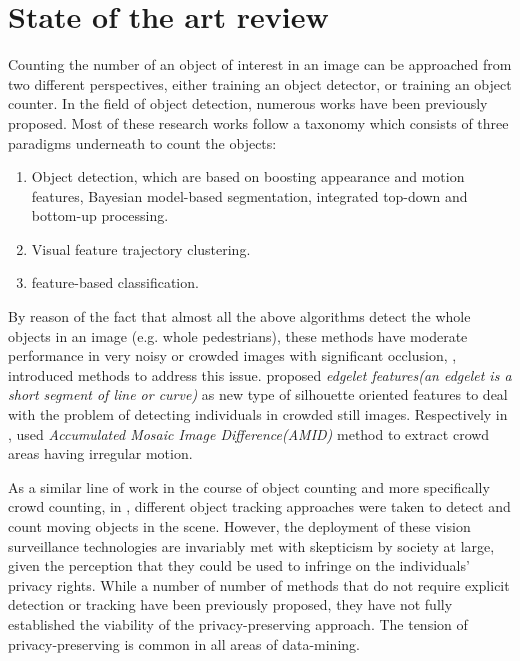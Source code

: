 \newpage
\chapter{State of the art review}
\label{sec:related_work}
Counting the number of an object of interest in an image can be approached from two different perspectives, either training an object detector, or training an object counter\cite{segui2015learning}. In the field of object detection, numerous works have been previously proposed\cite{paragios2001mrf, cho1999neural, regazzoni1996distributed, davies1995crowd, kong2005counting, marana1998efficacy, viola2004robust}. Most of these research works follow a taxonomy which consists of three paradigms underneath to count the objects:
\begin{enumerate}
	\item Object detection, which are based on boosting appearance and motion features\cite{viola2005detecting, viola2004robust}, Bayesian model-based segmentation\cite{zhao2003bayesian}, integrated top-down and bottom-up processing\cite{leibe2005pedestrian, oliva2003top}\cite{chan2008privacy}.
	\item Visual feature trajectory clustering. 
	\item feature-based classification.
\end{enumerate} 
By reason of the fact that almost all the above algorithms detect the whole objects in an image (e.g. whole pedestrians), these methods have moderate performance in very noisy or crowded images with significant occlusion, \citealt*{wu2005detection, lin2001estimation}, introduced methods to address this issue. \citealt*{wu2005detection} proposed \textit{edgelet features(an edgelet is a short segment of line or curve)} as new type of silhouette oriented features to deal with the problem of detecting individuals in crowded still images. Respectively in \cite{lin2001estimation}, \citeauthor*{lin2001estimation} used \textit{Accumulated Mosaic Image Difference(AMID)} method to extract crowd areas having irregular motion. 

\indent As a similar line of work in the course of object counting and more specifically crowd counting, in \cite{rabaud2006counting, brostow2006unsupervised, leibe2007coupled}, different object tracking approaches were taken to detect and count moving objects in the scene. However, the deployment of these vision surveillance technologies are invariably met with skepticism by society at large, given the perception that they could be used to infringe on the individuals' privacy rights. While a number of number of methods that do not require explicit detection or tracking have been previously proposed\cite{paragios2001mrf, cho1999neural, regazzoni1996distributed, davies1995crowd, kong2005counting, marana1998efficacy, dong2007fast}, they have not fully established the viability of the privacy-preserving approach\cite{chan2008privacy}. The tension of privacy-preserving is common in all areas of data-mining\cite{vaidya2006privacy, verykios2004state}. 


